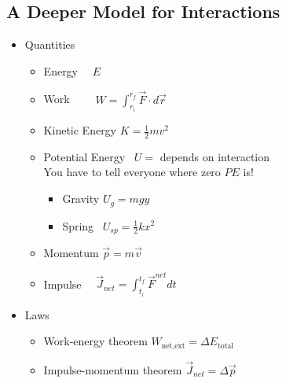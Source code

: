 \documentclass[]{article}
\begin{document}
\begin{PresentSpace}
\vspace{-10pt}
\section*{A Deeper Model for Interactions}
\vspace{-10pt}
\begin{itemize}
	\item Quantities
	\begin{itemize}
		\item Energy \qquad \qquad \qquad \quad \ \ $E$
		\item Work \qquad \qquad \qquad \quad \ \ \ \ $W = \int_{r_{i}}^{r_{f}}\vec{F}\cdot d\vec{r}$
		\item Kinetic Energy \qquad \qquad $K=\frac{1}{2}mv^{2}$
		\item Potential Energy \qquad \quad \ $U=$ depends on interaction \\
		You have to tell everyone where zero $PE$ is!
		\begin{itemize}
			\item Gravity \qquad $U_{g} = mgy$
			\item Spring \qquad \ $U_{sp} = \frac{1}{2}kx^{2}$
		\end{itemize}
		\item Momentum \qquad \qquad \qquad $\vec{p}=m\vec{v}$
		\item Impulse \qquad \qquad \quad \quad \ \ $\vec{J}_{net}=\int_{t_{i}}^{t_{f}}\vec{F}^{net}dt$
	\end{itemize}
	\item Laws
	\begin{itemize}
		\item Work-energy theorem \qquad $W_{\text{net,ext}} = \Delta E_{\text{total}}$
		\item Impulse-momentum theorem \qquad $\vec{J}_{net} = \Delta\vec{p}$
	\end{itemize}
\end{itemize}
\end{PresentSpace}
\newpage
\begin{TeacherMargin}

\end{TeacherMargin}
\end{document}
